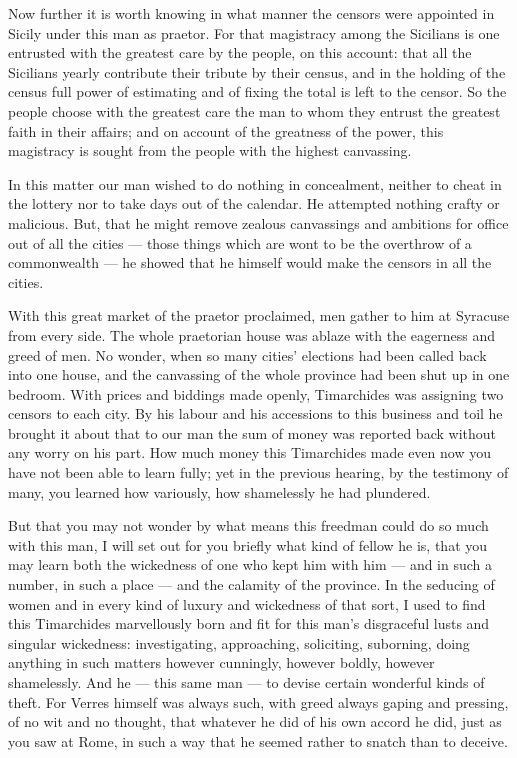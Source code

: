  Now further it is worth knowing in what manner the censors were appointed in Sicily under this man as praetor. For that magistracy among the Sicilians is one entrusted with the greatest care by the people, on this account: that all the Sicilians yearly contribute their tribute by their census, and in the holding of the census full power of estimating and of fixing the total is left to the censor. So the people choose with the greatest care the man to whom they entrust the greatest faith in their affairs; and on account of the greatness of the power, this magistracy is sought from the people with the highest canvassing.

 In this matter our man wished to do nothing in concealment, neither to cheat in the lottery nor to take days out of the calendar. He attempted nothing crafty or malicious. But, that he might remove zealous canvassings and ambitions for office out of all the cities --- those things which are wont to be the overthrow of a commonwealth --- he showed that he himself would make the censors in all the cities.

 With this great market of the praetor proclaimed, men gather to him at Syracuse from every side. The whole praetorian house was ablaze with the eagerness and greed of men. No wonder, when so many cities' elections had been called back into one house, and the canvassing of the whole province had been shut up in one bedroom. With prices and biddings made openly, Timarchides was assigning two censors to each city. By his labour and his accessions to this business and toil he brought it about that to our man the sum of money was reported back without any worry on his part. How much money this Timarchides made even now you have not been able to learn fully; yet in the previous hearing, by the testimony of many, you learned how variously, how shamelessly he had plundered.

 But that you may not wonder by what means this freedman could do so much with this man, I will set out for you briefly what kind of fellow he is, that you may learn both the wickedness of one who kept him with him --- and in such a number, in such a place --- and the calamity of the province. In the seducing of women and in every kind of luxury and wickedness of that sort, I used to find this Timarchides marvellously born and fit for this man's disgraceful lusts and singular wickedness: investigating, approaching, soliciting, suborning, doing anything in such matters however cunningly, however boldly, however shamelessly. And he --- this same man --- to devise certain wonderful kinds of theft. For Verres himself was always such, with greed always gaping and pressing, of no wit and no thought, that whatever he did of his own accord he did, just as you saw at Rome, in such a way that he seemed rather to snatch than to deceive.

